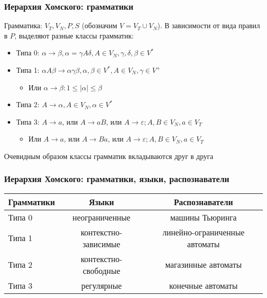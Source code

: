 \documentclass{beamer}
\begin{document}
\begin{frame}[fragile]
  \transwipe[direction=90]
  \frametitle{Иерархия Хомского: грамматики}
  Грамматика: $V_T, V_N, P, S$ (обозначим $V = V_T \cup V_N$). В зависимости от вида правил в $P$, выделяют разные классы грамматик:
  
  \begin{itemize}
    \item Типа 0: $\alpha \rightarrow \beta, \alpha = \gamma A \delta, A \in V_N, \gamma, \delta, \beta \in V^*$
    \item Типа 1: $\alpha A \beta \rightarrow \alpha \gamma \beta, \alpha, \beta \in V^*, A \in V_N, \gamma \in V^+$
    \begin{itemize}
      \item Или $\alpha \rightarrow \beta: 1 \leq |\alpha| \leq \beta $
    \end{itemize}
    \item Типа 2: $A \rightarrow \alpha, A \in V_N, \alpha \in V^*$
    \item Типа 3: $A \rightarrow a$, или $A \rightarrow a B$, или $A \rightarrow \varepsilon; A, B \in V_N, a \in V_T$
    \begin{itemize}
      \item Или $A \rightarrow a$, или $A \rightarrow B a$, или $A \rightarrow \varepsilon; A, B \in V_N, a \in V_T$
    \end{itemize}
  \end{itemize}
  
  Очевидным образом классы грамматик вкладываются друг в друга


\end{frame}


\begin{frame}[fragile]
  \transwipe[direction=90]
  \frametitle{Иерархия Хомского: грамматики, языки, распознаватели}
\begin{center}
\begin{tabular}{ l | c | c }
  Грамматики & Языки & Распознаватели \\ \hline \hline
  Типа 0 & неограниченные & машины Тьюринга \\ \hline
  Типа 1 & контекстно-зависимые & линейно-ограниченные автоматы \\ \hline
  Типа 2 & контекстно-свободные & магазинные автоматы \\ \hline
  Типа 3 & регулярные & конечные автоматы
  
\end{tabular}  
\end{center}

\end{frame}
\end{document}
